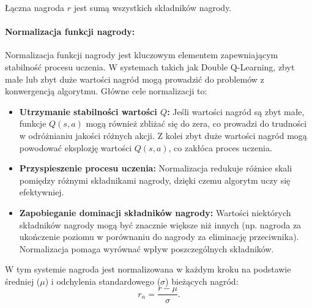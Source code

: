 Łączna nagroda $r$ jest sumą wszystkich składników nagrody.
\paragraph{Normalizacja funkcji nagrody:}

Normalizacja funkcji nagrody jest kluczowym elementem zapewniającym stabilność procesu uczenia. W systemach takich jak Double Q-Learning, zbyt małe lub zbyt duże wartości nagród mogą prowadzić do problemów z konwergencją algorytmu. Główne cele normalizacji to:

\begin{itemize}
	\item \textbf{Utrzymanie stabilności wartości \(Q\):} Jeśli wartości nagród są zbyt małe, funkcje \(Q(s, a)\) mogą również zbliżać się do zera, co prowadzi do trudności w odróżnianiu jakości różnych akcji. Z kolei zbyt duże wartości nagród mogą powodować eksplozję wartości \(Q(s, a)\), co zakłóca proces uczenia.
	\item \textbf{Przyspieszenie procesu uczenia:} Normalizacja redukuje różnice skali pomiędzy różnymi składnikami nagrody, dzięki czemu algorytm uczy się efektywniej.
	\item \textbf{Zapobieganie dominacji składników nagrody:} Wartości niektórych składników nagrody mogą być znacznie większe niż innych (np. nagroda za ukończenie poziomu w porównaniu do nagrody za eliminację przeciwnika). Normalizacja pomaga wyrównać wpływ poszczególnych składników.
\end{itemize}

W tym systemie nagroda jest normalizowana w każdym kroku na podstawie średniej (\(\mu\)) i odchylenia standardowego (\(\sigma\)) bieżących nagród:
\[
	r_n = \frac{r - \mu}{\sigma}.
\]
